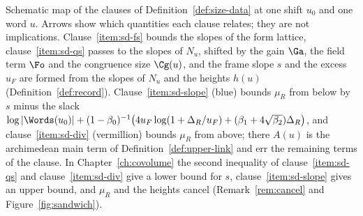 \caption{Schematic map of the clauses of Definition~\ref{def:size-data}
at one shift $u_0$ and one word $u$. Arrows show which quantities each
clause relates; they are not implications. Clause~\ref{item:sd-fs}
bounds the slopes of the form lattice, clause~\ref{item:sd-qs} passes
to the slopes of $N_u$, shifted by the gain $\Ga$, the field term
$\Fo$ and the congruence size $\Cg(u)$, and the frame slope $s$ and the
excess $u_F$ are formed from the slopes of $N_u$ and the heights $h(u)$
(Definition~\ref{def:record}). Clause~\ref{item:sd-slope} (blue)
bounds $\mu_R$ from below by $s$ minus the slack
$\log|\Words(u_0)|+(1-\beta_0)^{-1}\bigl(4u_F\log(1+\Delta_R/u_F)
+(\beta_1+4\sqrt{\beta_2})\Delta_R\bigr)$, and
clause~\ref{item:sd-div} (vermillion) bounds $\mu_R$ from above; there
$A(u)$ is the archimedean main term of Definition~\ref{def:upper-link}
and err the remaining terms of the clause. In
Chapter~\ref{ch:covolume} the second inequality of
clause~\ref{item:sd-qs} and clause~\ref{item:sd-div} give a lower bound
for $s$, clause~\ref{item:sd-slope} gives an upper bound, and $\mu_R$
and the heights cancel (Remark~\ref{rem:cancel} and
Figure~\ref{fig:sandwich}).}
\label{fig:clause-map}
